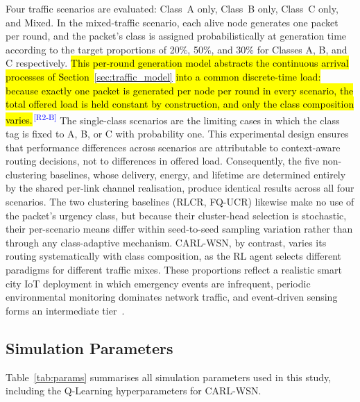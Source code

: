 \documentclass[12pt]{article}
\newcommand{\rtag}[1]{\textsuperscript{\textcolor{blue}{\scriptsize\,[#1]}}}
\newcommand{\hlx}[1]{{\exhyphenpenalty=10000\hyphenpenalty=10000\let\ \nobreakspace\hl{#1}}}
\begin{document}
Four traffic scenarios are evaluated: Class~A only, Class~B only,
Class~C only, and Mixed. In the mixed-traffic scenario, each alive node
generates one packet per round, and the packet's class is assigned
probabilistically at generation time according to the target proportions
of 20\%, 50\%, and 30\% for Classes A, B, and C respectively. \hlx{This
per-round generation model abstracts the continuous arrival processes of
Section~}\ref{sec:traffic_model}\hlx{ into a common discrete-time load: because
exactly one packet is generated per node per round in every scenario, the
total offered load is held constant by construction, and only the class
composition varies.}\rtag{R2-B} The single-class scenarios are the limiting cases in
which the class tag is fixed to A, B, or C with probability one. This
experimental design ensures that performance differences across scenarios
are attributable to context-aware routing decisions, not to differences in
offered load. Consequently, the five non-clustering baselines, whose
delivery, energy, and lifetime are determined entirely by the shared
per-link channel realisation, produce identical results across all four
scenarios. The two clustering baselines (RLCR, FQ-UCR) likewise make no use
of the packet's urgency class, but because their cluster-head selection is
stochastic, their per-scenario means differ within seed-to-seed sampling
variation rather than through any class-adaptive mechanism. CARL-WSN, by
contrast, varies its routing systematically with class composition, as the
RL agent selects different paradigms for different traffic mixes. These
proportions reflect a realistic smart city IoT deployment in which emergency
events are infrequent, periodic environmental monitoring dominates network
traffic, and event-driven sensing forms an intermediate
tier~\cite{el-fouly_environment-aware_2023,zohrabi2024}.

\subsection{Simulation Parameters}

Table~\ref{tab:params} summarises all simulation parameters used in
this study, including the Q-Learning hyperparameters for CARL-WSN.
\end{document}
